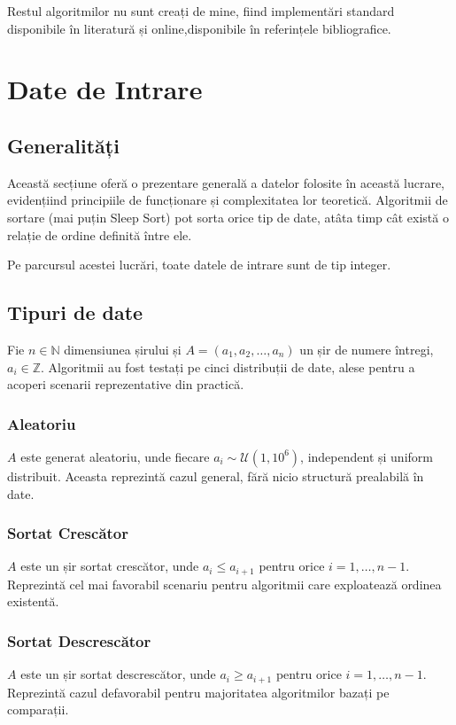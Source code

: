 \documentclass[9pt,a4paper,twocolumn,twoside]{rho-class/rho}
\begin{document}
Restul algoritmilor nu sunt creați de mine, fiind implementări standard disponibile în literatură și online,disponibile în referințele bibliografice.

\section{Date de Intrare}
\label{sec:DateIntrare}
    \subsection{Generalități}
    Această secțiune oferă o prezentare generală a datelor folosite în această lucrare, evidențiind principiile de funcționare și complexitatea lor teoretică.
    Algoritmii de sortare (mai puțin Sleep Sort) pot sorta orice tip de date, atâta timp cât există o relație de ordine definită între ele.
    
    Pe parcursul acestei lucrări, toate datele de intrare sunt de tip integer.

    \subsection{Tipuri de date}
    \label{sec:distributii}


    Fie $n \in \mathbb{N}$ dimensiunea șirului și $A = (a_1, a_2, \dots, a_n)$ 
un șir de numere întregi, $a_i \in \mathbb{Z}$. Algoritmii au fost testați 
pe cinci distribuții de date, alese pentru a acoperi scenarii reprezentative 
din practică.

\subsubsection{Aleatoriu}
$A$ este generat aleatoriu, unde fiecare $a_i \sim \mathcal{U}(1, 10^6)$, 
independent și uniform distribuit. Aceasta reprezintă cazul general, fără 
nicio structură prealabilă în date.

\subsubsection{Sortat Crescător}
$A$ este un șir sortat crescător, unde $a_i \leq a_{i+1}$ pentru orice 
$i = 1, \dots, n-1$. Reprezintă cel mai favorabil scenariu pentru algoritmii 
care exploatează ordinea existentă.

\subsubsection{Sortat Descrescător}
$A$ este un șir sortat descrescător, unde $a_i \geq a_{i+1}$ pentru orice 
$i = 1, \dots, n-1$. Reprezintă cazul defavorabil pentru majoritatea 
algoritmilor bazați pe comparații.
\end{document}
